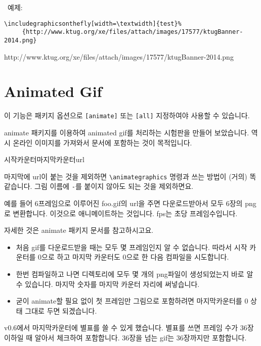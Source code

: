 \documentclass[b5paper,nanum]{oblivoir}
\def\cs#1{\texttt{\textbackslash #1}}
\begin{document}
\bigskip

\noindent\textbullet\ 예제:
\begin{verbatim}
\includegraphicsonthefly[width=\textwidth]{test}%
     {http://www.ktug.org/xe/files/attach/images/17577/ktugBanner-2014.png}
\end{verbatim}
%
     {http://www.ktug.org/xe/files/attach/images/17577/ktugBanner-2014.png}


\section{Animated Gif}

이 기능은 패키지 옵션으로 \texttt{[animate]} 또는 \texttt{[all]} 지정하여야 사용할 수 있습니다.

animate 패키지를 이용하여 animated gif를 처리하는 시험판을 만들어 보았습니다. 역시 온라인 이미지를 가져와서 문서에 포함하는 것이 목적입니다.
\begin{boxedverbatim}
%
                    {시작카운터}{마지막카운터}{url}
\end{boxedverbatim}
마지막에 url이 붙는 것을 제외하면 \cs{animategraphics} 명령과 쓰는 방법이 (거의) 똑같습니다. 그림 이름에 \verb|-|를 붙이지 않아도 되는 것을 제외하면요.

예를 들어 6프레임으로 이루어진 foo.gif의 url을 주면 다운로드받아서 모두 6장의 png로 변환합니다. 이것으로 애니메이트하는 것입니다. fps는 초당 프레임수입니다.

자세한 것은 animate 패키지 문서를 참고하시고요.

\begin{itemize}\firmlist
\item    처음 gif를 다운로드받을 때는 모두 몇 프레임인지 알 수 없습니다. 따라서 시작 카운터를 0으로 하고 마지막 카운터도 0으로 한 다음 컴파일을 시도합니다.
\item    한번 컴파일하고 나면 디렉토리에 모두 몇 개의 png파일이 생성되었는지 바로 알 수 있습니다. 마지막 숫자를 마지막 카운터 자리에 써넣습니다.
\item 굳이 animate할 필요 없이 첫 프레임만 그림으로 포함하려면 마지막카운터를 0 상태 그대로 두면 되겠습니다.
\end{itemize}

v0.6에서 마지막카운터에 별표를 쓸 수 있게 했습니다. 별표를 쓰면 프레임 수가 36장 이하일 때 알아서 체크하여 포함합니다. 36장을 넘는 gif는 36장까지만 포함합니다.
\end{document}
